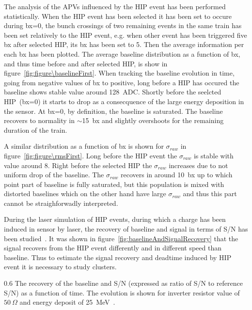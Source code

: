 The analysis of the APVs influenced by the HIP event has been performed statistically. When the HIP event has been selected it has been set to occure during bx=0, the bunch crossings of two remaining events in the same train has been set relatively to the HIP event, e.g. when other event has been triggered five bx after selected HIP, its bx has been set to 5. Then the average information per each bx has been plotted. The average baseline distribution as a function of bx, and thus time before and after selected HIP, is show in figure~\ref{fig:figure\baselineFirst}. When tracking the baseline evolution in time, going from negative values of bx to positive, long before a HIP has occured the baseline shows stable value around 128~ADC. Shortly before the seelcted HIP~(bx=0) it starts to drop as a consecquence of the large energy deposition in the sensor. At bx=0, by definition, the baseline is saturated. The baseline recovers to normality in $\sim$15~bx and slightly overshoots for the remaining duration of the train.

A similar distribution as a function of bx is shown for $\sigma_{raw}$ in figure~\ref{fig:figure\rmsFirst}. Long before the HIP event the $\sigma_{raw}$ is stable with value around 8. Right before the selected HIP the $\sigma_{raw}$ increases due to not uniform drop of the baseline. The $\sigma_{raw}$ recovers in around 10~bx up to which point part of baseline is fully saturated, but this population is mixed with distorted baselines which on the other hand have large $\sigma_{raw}$ and thus this part cannot be straighforwadly interpreted.




During the laser simulation of HIP events, during which a charge has been induced in sensor by laser, the recovery of baseline and signal in terms of S/N has been studied~\cite{Adam:2005pz}. It was shown in figure~\ref{fig:baselineAndSignalRecovery} that the signal recovers from the HIP event differently and in different speed than baseline. Thus to estimate the signal recovery and deadtime induced by HIP event it is necessary to study clusters.

                 {0.6}       %
                 {The recovery of the baseline and S/N (expressed as ratio of S/N to reference S/N) as a function of time. The evolution is shown for inverter resistor value of $50~\Omega$ and energy deposit of 25~MeV~\cite{Adam:2005pz}.} %

